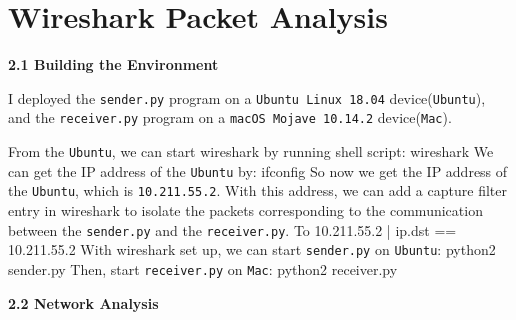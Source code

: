 \documentclass{article}%
\newenvironment{code}%
   {\snugshade\verbatim}%
   {\endverbatim\endsnugshade}
\begin{document}
\section{Wireshark Packet Analysis}
\begin{Large}

\begin{LARGE}
\begin{flushleft}
\textbf{2.1 Building the Environment}
\end{flushleft}
\end{LARGE}

I deployed the \texttt{sender.py} program on a \texttt{Ubuntu Linux 18.04} device(\texttt{Ubuntu}), and the \texttt{receiver.py} program on a \texttt{macOS Mojave 10.14.2} device(\texttt{Mac}).

From the \texttt{Ubuntu}, we can start wireshark by running shell script:
\begin{code}
    wireshark
\end{code}
We can get the IP address of the \texttt{Ubuntu} by:
\begin{code}
    ifconfig
\end{code}
So now we get the IP address of the \texttt{Ubuntu}, which is \texttt{10.211.55.2}. With this address, we can add a capture filter entry in wireshark to isolate the packets corresponding to the communication between the \texttt{sender.py} and the \texttt{receiver.py}.
\begin{code}
    To 10.211.55.2 | ip.dst == 10.211.55.2
\end{code}
With wireshark set up, we can start \texttt{sender.py} on \texttt{Ubuntu}:
\begin{code}
    python2 sender.py
\end{code}
Then, start \texttt{receiver.py} on \texttt{Mac}:
\begin{code}
    python2 receiver.py
\end{code}

\begin{LARGE}
\begin{flushleft}
\textbf{2.2 Network Analysis}
\end{flushleft}
\end{LARGE}


\end{Large}
\end{document}
